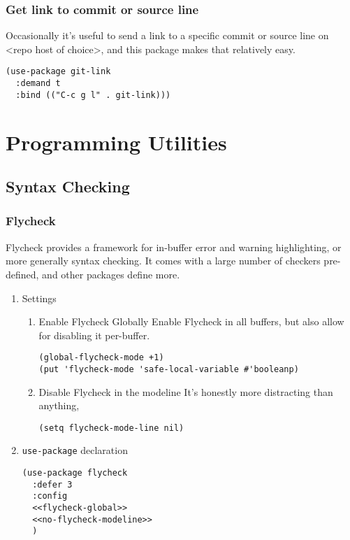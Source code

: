 \documentclass[11pt]{article}
\begin{document}
\subsubsection{Get link to commit or source line}
\label{sec:orge51a6da}
Occasionally it's useful to send a link to a specific commit or source
line on <repo host of choice>, and this package makes that relatively
easy.
\begin{verbatim}
(use-package git-link
  :demand t
  :bind (("C-c g l" . git-link)))
\end{verbatim}
\section{Programming Utilities}
\label{sec:orgbd1e930}
\subsection{Syntax Checking}
\label{sec:orgfd3694a}
\subsubsection{Flycheck}
\label{sec:org966d505}
Flycheck provides a framework for in-buffer error and warning
highlighting, or more generally syntax checking. It comes with a large
number of checkers pre-defined, and other packages define more.

\begin{enumerate}
\item Settings
\label{sec:org4733101}
\begin{enumerate}
\item Enable Flycheck Globally
\label{sec:org94c90d0}
Enable Flycheck in all buffers, but also allow for disabling it
per-buffer.

\begin{verbatim}
(global-flycheck-mode +1)
(put 'flycheck-mode 'safe-local-variable #'booleanp)
\end{verbatim}

\item Disable Flycheck in the modeline
\label{sec:org7d4d445}
It's honestly more distracting than anything,

\begin{verbatim}
(setq flycheck-mode-line nil)
\end{verbatim}
\end{enumerate}

\item \texttt{use-package} declaration
\label{sec:org44cf633}
\begin{verbatim}
(use-package flycheck
  :defer 3
  :config
  <<flycheck-global>>
  <<no-flycheck-modeline>>
  )
\end{verbatim}
\end{enumerate}
\end{document}
